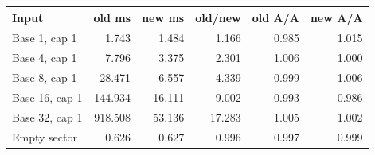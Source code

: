 \begin{center}
\small
\begin{tabular}{lrrrrr}
\toprule
Input & old ms & new ms & old/new & old A/A & new A/A\\
\midrule
Base 1, cap 1 & 1.743 & 1.484 & 1.166 & 0.985 & 1.015\\
Base 4, cap 1 & 7.796 & 3.375 & 2.301 & 1.006 & 1.000\\
Base 8, cap 1 & 28.471 & 6.557 & 4.339 & 0.999 & 1.006\\
Base 16, cap 1 & 144.934 & 16.111 & 9.002 & 0.993 & 0.986\\
Base 32, cap 1 & 918.508 & 53.136 & 17.283 & 1.005 & 1.002\\
Empty sector & 0.626 & 0.627 & 0.996 & 0.997 & 0.999\\
\bottomrule
\end{tabular}
\end{center}
